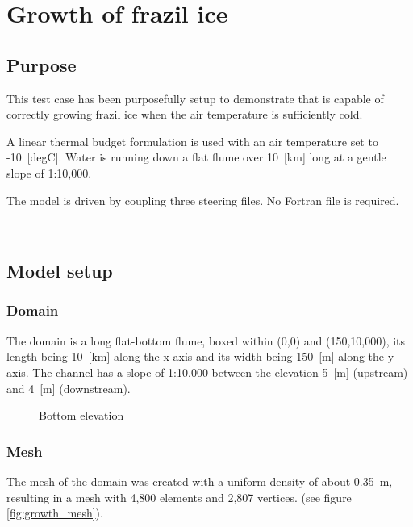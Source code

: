 \renewcommand{\labelitemi}{$\triangleright$}

\chapter{Growth of frazil ice}
%
%
\section{Purpose}
This test case has been purposefully setup to demonstrate that \khione is capable of correctly growing frazil ice when the air temperature is sufficiently cold.\newline

A linear thermal budget formulation is used with an air temperature set to -10~[degC]. Water is running down a flat flume over 10~[km] long at a gentle slope of 1:10,000.\newline

The model is driven by coupling three steering files. No Fortran file is required.

~\newline
\section{Model setup}

\subsection{Domain}
The domain is a long flat-bottom flume, boxed within (0,0) and (150,10,000), its length being 10~[km] along the x-axis and its width being 150~[m] along the y-axis. The channel has a slope of 1:10,000 between the elevation 5~[m] (upstream) and 4~[m] (downstream).

\begin{figure}[H]
    \begin{center}
    \end{center}
    \caption{Bottom elevation}
    \label{fig:growth_bottom}
\end{figure}

\subsection{Mesh}
The mesh of the domain was created with a uniform density of about 0.35~m, resulting in a mesh with 4,800 elements and 2,807 vertices. (see figure \ref{fig:growth_mesh}).

